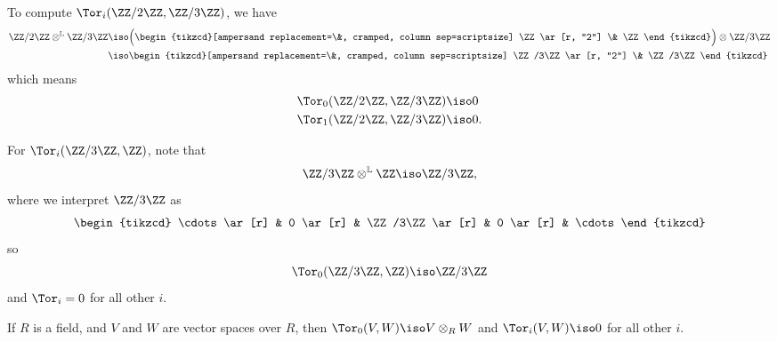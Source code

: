 \documentclass{standalone}
\begin{document}
\begin{example}
  To compute \(\Tor_i(\ZZ/2\ZZ, \ZZ/3\ZZ)\), we have
  \begin{align*}
    \ZZ/2\ZZ \otimes^{\mathbb L} \ZZ/3\ZZ
      &\iso \Big(
        \begin{tikzcd}[ampersand replacement=\&,
                       cramped, column sep=scriptsize]
          \ZZ \ar[r, "2"] \& \ZZ
        \end{tikzcd}
      \Big) \otimes \ZZ/3\ZZ \\
      &\iso \begin{tikzcd}[ampersand replacement=\&,
                           cramped, column sep=scriptsize]
          \ZZ/3\ZZ \ar[r, "2"] \& \ZZ/3\ZZ
        \end{tikzcd}
  \end{align*}
  which means
  \begin{align*}
    \Tor_0(\ZZ/2\ZZ, \ZZ/3\ZZ) &\iso 0 \\
    \Tor_1(\ZZ/2\ZZ, \ZZ/3\ZZ) &\iso 0.
  \end{align*}
\end{example}

\begin{example}
  For \(\Tor_i(\ZZ/3\ZZ, \ZZ)\), note that
  \[
    \ZZ/3\ZZ \otimes^{\mathbb L} \ZZ \iso \ZZ/3\ZZ,
  \]
  where we interpret \(\ZZ/3\ZZ\) as
  \[
    \begin{tikzcd}
      \cdots \ar[r] &
        0 \ar[r] &
        \ZZ/3\ZZ \ar[r] &
        0 \ar[r] &
        \cdots
    \end{tikzcd}
  \]
  so
  \[
    \Tor_0(\ZZ/3\ZZ, \ZZ) \iso \ZZ/3\ZZ
  \]
  and \(\Tor_i = 0\) for all other \(i\).
\end{example}

\begin{example}
  If \(R\) is a field, and \(V\) and \(W\) are vector spaces over \(R\),
  then \(\Tor_0(V, W) \iso V \otimes_R W\) and \(\Tor_i(V, W) \iso 0\)
  for all other \(i\).
\end{example}
\end{document}
